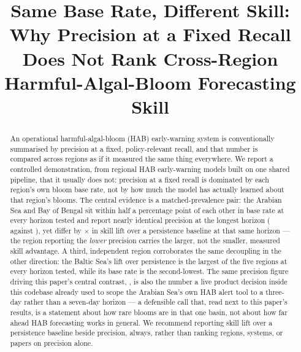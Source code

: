 \documentclass[conference]{IEEEtran}
\begin{document}
\title{Same Base Rate, Different Skill: Why Precision at a Fixed Recall Does
Not Rank Cross-Region Harmful-Algal-Bloom Forecasting Skill}

\author{
}

\maketitle

\begin{abstract}
An operational harmful-algal-bloom (HAB) early-warning system is
conventionally summarised by precision at a fixed, policy-relevant recall,
and that number is compared across regions as if it measured the same thing
everywhere. We report a controlled demonstration, from \NRegions{} regional
HAB early-warning models built on one shared pipeline, that it usually does
not: precision at a fixed recall is dominated by each region's own bloom
base rate, not by how much the model has actually learned about that
region's blooms. The central evidence is a matched-prevalence pair: the
Arabian Sea and Bay of Bengal sit within half a percentage point of each
other in base rate at every horizon tested and report nearly identical
precision at the longest horizon (\HabArabianPrecSeven{} against
\HabBengalPrecSeven{}), yet differ by \HabLiftRatioSeven{}$\times$ in skill
lift over a persistence baseline at that same horizon --- the region
reporting the \emph{lower} precision carries the larger, not the smaller,
measured skill advantage. A third, independent region corroborates the same
decoupling in the other direction: the Baltic Sea's lift over persistence is
the largest of the five regions at every horizon tested, while its base rate
is the second-lowest. The same precision figure driving this paper's central
contrast, \HabArabianPrecSeven{}, is also the number a live product decision
inside this codebase already used to scope the Arabian Sea's own HAB alert
tool to a three-day rather than a seven-day horizon --- a defensible call
that, read next to this paper's results, is a statement about how rare
blooms are in that one basin, not about how far ahead HAB forecasting works
in general. We recommend reporting skill lift over a persistence baseline
beside precision, always, rather than ranking regions, systems, or papers on
precision alone.
\end{abstract}
\end{document}
